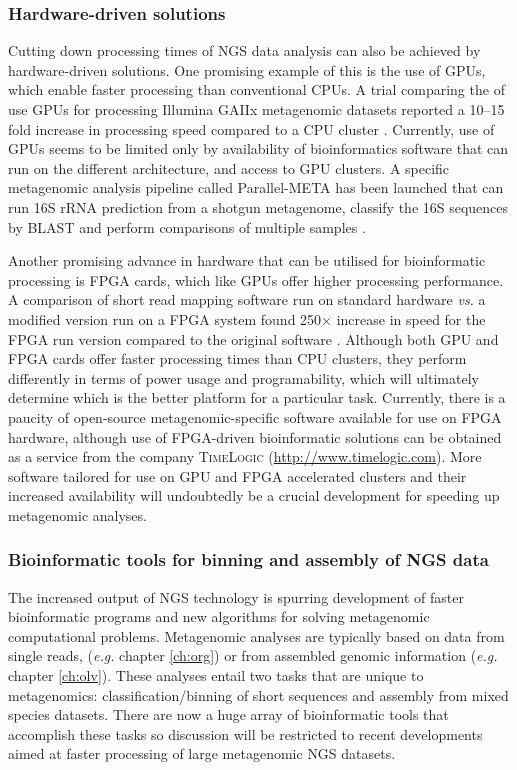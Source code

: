 \subsubsection{Hardware-driven solutions}
Cutting down processing times of \ac{NGS} data analysis can also be achieved by hardware-driven solutions.
One promising example of this is the use of \acp{GPU}, which enable faster processing than conventional \acp{CPU}.
A trial comparing the of use \acp{GPU} for processing Illumina GAIIx metagenomic datasets reported a 10--15 fold increase in processing speed compared to a \ac{CPU} cluster \cite{Su2012}.
Currently, use of \acp{GPU} seems to be limited only by availability of bioinformatics software that can run on the different architecture, and access to \ac{GPU} clusters.
A specific metagenomic analysis pipeline called Parallel-META has been launched that can run 16S \acs{rRNA} prediction from a shotgun metagenome, classify the 16S sequences by \acs{BLAST} and perform comparisons of multiple samples \cite{Su2012}.

Another promising advance in hardware that can be utilised for bioinformatic processing is \ac{FPGA} cards, which like \acp{GPU} offer higher processing performance.
A comparison of short read mapping software run on standard hardware \emph{vs.} a modified version run on a \ac{FPGA} system found 250$\times$ increase in speed for the \ac{FPGA} run version compared to the original software \cite{Olson2012}.
Although both \ac{GPU} and \ac{FPGA} cards offer faster processing times than \ac{CPU} clusters, they perform differently in terms of power usage and programability, which will ultimately determine which is the better platform for a particular task.
Currently, there is a paucity of open-source metagenomic-specific software available for use on \ac{FPGA} hardware, although use of \ac{FPGA}-driven bioinformatic solutions can be obtained as a service from the company \textsc{TimeLogic} 
(\url{http://www.timelogic.com}).
More software tailored for use on \ac{GPU} and \ac{FPGA} accelerated clusters and their increased availability will undoubtedly be a crucial development for speeding up metagenomic analyses.

\subsubsection{Bioinformatic tools for binning and assembly of \acs{NGS} data}
The increased output of \ac{NGS} technology is spurring development of faster bioinformatic programs and new algorithms for solving metagenomic computational problems.
Metagenomic analyses are typically based on data from single reads, (\emph{e.g.} chapter \ref{ch:org}) or from assembled genomic information (\emph{e.g.} chapter \ref{ch:olv}).
These analyses entail two tasks that are unique to metagenomics: classification/binning of short sequences and assembly from mixed species datasets. 
There are now a huge array of bioinformatic tools that accomplish these tasks so discussion will be restricted to recent developments aimed at faster processing of large metagenomic \ac{NGS} datasets.

